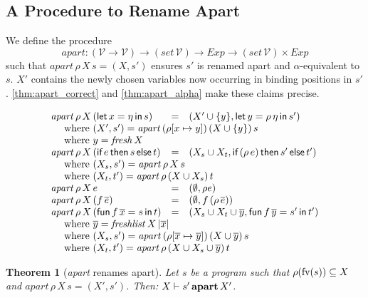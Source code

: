\documentclass[openright,a4paper,11pt]{scrartcl}
\newcommand{\slist}[1]{\ensuremath{\overline{#1}}}
\newcommand{\M}[1]{\ensuremath{\mathit{#1}}}
\newcommand{\incl}{\ensuremath{\subseteq}}
\newcommand{\set}[1]{\ensuremath{\{#1\}}}
\newcommand{\Exp}{\ensuremath{\M{Exp}}}
\newcommand{\Var}{\ensuremath{\mathcal{V}}}
\newcommand{\fv}{\ensuremath{\textup{fv}}}
\newcommand{\ilIn}{\textsf{in}}
\newcommand{\ilReturn}[1]{#1}
\newcommand{\ilGoto}[2]{#1\,#2}
\newcommand{\ilLetRec}[4]{\textsf{fun}\,#1\,#2=#3\,\ilIn\,#4}
\newcommand{\ilLet}[3]{\textsf{let}\,#1=#2\,\ilIn\,#3}
\newcommand{\ilIf}[3]{\textsf{if}\,{#1}\,\textsf{then}\,{#2}\,\textsf{else}\,{#3}}
\newcommand{\freenam}[1]{\ensuremath{\fv(#1)}}
\newcommand{\myref}[1]{\autoref{#1}}
\theoremstyle{plain}
\newtheorem{theorem}{Theorem}
\theoremstyle{plain}
\theoremstyle{plain}
\theoremstyle{plain}
\theoremstyle{nonumberplain}
\begin{document}
\subsection{A Procedure to Rename Apart}

\renewcommand{\ra}[3]{\mathit{apart}\,#1\,#2\,#3}

We define the procedure $$\mathit{apart}:(\Var\to\Var)\to(\M{set}\,\Var)\to\Exp\to(\M{set}\,\Var)\times\Exp$$ such that $\ra{\rho}{X}{s}=(X,s')$ ensures $s'$ is renamed apart and $\alpha$-equivalent to $s$. $X'$ contains the newly chosen variables now occurring in binding positions in $s'$.
\myref{thm:apart_correct} and \myref{thm:apart_alpha} make these claims precise.

\[
\begin{array}{lrl}
\ra{\rho}{X}{(\ilLet{x}{\eta}{s})}&=&(X' \cup \set{y}, \ilLet{y}{\rho\,\eta}{s'})\\
\multicolumn{3}{l}{\quad~\textup{where}~(X', s') = \ra{(\rho[x\mapsto y])}{(X \cup \set{y})}{s}}\\
\multicolumn{3}{l}{\quad~\textup{where}~y = \fresh{X}}\\
\ra{\rho}{X}{(\ilIf{e}{\sterm}{\tterm})}&=&(X_s\cup X_t, \ilIf{(\rho\,e)}{s'}{t'})\\
\multicolumn{3}{l}{\quad~\textup{where}~(X_s, s') = \ra{\rho}{X}{s}}\\
\multicolumn{3}{l}{\quad~\textup{where}~(X_t, t') = \ra{\rho}{(X \cup X_s)}{t}}\\
\ra{\rho}{X}{\ilReturn{e}}&=&(\emptyset, \ilReturn{\rho e})\\
\ra{\rho}{X}{(\ilGoto{f}{\slist{e}})}&=&(\emptyset, \ilGoto{f}{(\rho\,\slist{e})})\\
\ra{\rho}{X}{(\ilLetRec{f}{\slist{x}}{s}{t})}&=&(X_s\cup X_t \cup \slist{y}, \ilLetRec{f}{\slist{y}}{s'}{t'})\\
\multicolumn{3}{l}{\quad~\textup{where}~\slist{y} = \freshl{X}{|\slist{x}|}}\\
\multicolumn{3}{l}{\quad~\textup{where}~(X_s, s') = \ra{(\rho[\slist{x}\mapsto\slist{y}])}{(X\cup \slist{y})}{s}}\\
\multicolumn{3}{l}{\quad~\textup{where}~(X_t, t') = \ra{\rho}{(X \cup X_s \cup \slist{y})}{t}}\\
\end{array}
\]

\begin{theorem}[\textnormal{\textit{apart}} renames apart]
Let $s$ be a program such that $\rho (\freenam{s}) \incl X$ and $\ra{\rho}{X}{s}=(X', s')$.
Then: $X\vdash s'\,\textbf{apart}\, X'$.
\label{thm:apart_correct}
\end{theorem}
\end{document}
